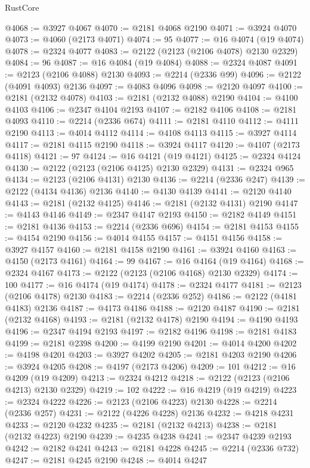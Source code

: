 \begin{lexlean}{RustCore}
\begin{coremodule}
@4068 := @3927 @4067
@4070 := @2181 @4068 @2190
@4071 := @3924 @4070
@4073 := @4060 (@2173 @4071)
@4074 := 95
@4077 := @16 @4074 (@19 @4074)
@4078 := @2324 @4077
@4083 := @2122 (@2123 (@2106 @4078) @2130 @2329)
@4084 := 96
@4087 := @16 @4084 (@19 @4084)
@4088 := @2324 @4087
@4091 := @2123 (@2106 @4088) @2130
@4093 := @2214 (@2336 @99)
@4096 := @2122 (@4091 @4093) @2136
@4097 := @4083 @4096
@4098 := @2120 @4097
@4100 := @2181 (@2132 @4078)
@4103 := @2181 (@2132 @4088) @2190
@4104 := @4100 @4103
@4106 := @2347 @4104 @2193
@4107 := @2182 @4106
@4108 := @2181 @4093
@4110 := @2214 (@2336 @674)
@4111 := @2181 @4110
@4112 := @4111 @2190
@4113 := @4014 @4112
@4114 := @4108 @4113
@4115 := @3927 @4114
@4117 := @2181 @4115 @2190
@4118 := @3924 @4117
@4120 := @4107 (@2173 @4118)
@4121 := 97
@4124 := @16 @4121 (@19 @4121)
@4125 := @2324 @4124
@4130 := @2122 (@2123 (@2106 @4125) @2130 @2329)
@4131 := @2324 @965
@4134 := @2123 (@2106 @4131) @2130
@4136 := @2214 (@2336 @247)
@4139 := @2122 (@4134 @4136) @2136
@4140 := @4130 @4139
@4141 := @2120 @4140
@4143 := @2181 (@2132 @4125)
@4146 := @2181 (@2132 @4131) @2190
@4147 := @4143 @4146
@4149 := @2347 @4147 @2193
@4150 := @2182 @4149
@4151 := @2181 @4136
@4153 := @2214 (@2336 @696)
@4154 := @2181 @4153
@4155 := @4154 @2190
@4156 := @4014 @4155
@4157 := @4151 @4156
@4158 := @3927 @4157
@4160 := @2181 @4158 @2190
@4161 := @3924 @4160
@4163 := @4150 (@2173 @4161)
@4164 := 99
@4167 := @16 @4164 (@19 @4164)
@4168 := @2324 @4167
@4173 := @2122 (@2123 (@2106 @4168) @2130 @2329)
@4174 := 100
@4177 := @16 @4174 (@19 @4174)
@4178 := @2324 @4177
@4181 := @2123 (@2106 @4178) @2130
@4183 := @2214 (@2336 @252)
@4186 := @2122 (@4181 @4183) @2136
@4187 := @4173 @4186
@4188 := @2120 @4187
@4190 := @2181 (@2132 @4168)
@4193 := @2181 (@2132 @4178) @2190
@4194 := @4190 @4193
@4196 := @2347 @4194 @2193
@4197 := @2182 @4196
@4198 := @2181 @4183
@4199 := @2181 @2398
@4200 := @4199 @2190
@4201 := @4014 @4200
@4202 := @4198 @4201
@4203 := @3927 @4202
@4205 := @2181 @4203 @2190
@4206 := @3924 @4205
@4208 := @4197 (@2173 @4206)
@4209 := 101
@4212 := @16 @4209 (@19 @4209)
@4213 := @2324 @4212
@4218 := @2122 (@2123 (@2106 @4213) @2130 @2329)
@4219 := 102
@4222 := @16 @4219 (@19 @4219)
@4223 := @2324 @4222
@4226 := @2123 (@2106 @4223) @2130
@4228 := @2214 (@2336 @257)
@4231 := @2122 (@4226 @4228) @2136
@4232 := @4218 @4231
@4233 := @2120 @4232
@4235 := @2181 (@2132 @4213)
@4238 := @2181 (@2132 @4223) @2190
@4239 := @4235 @4238
@4241 := @2347 @4239 @2193
@4242 := @2182 @4241
@4243 := @2181 @4228
@4245 := @2214 (@2336 @732)
@4247 := @2181 @4245 @2190
@4248 := @4014 @4247

\end{coremodule}
\end{lexlean}
